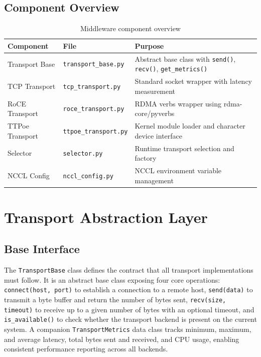 \documentclass[10pt,letterpaper]{article}
\begin{document}
\subsection{Component Overview}

\begin{table}[H]
\centering
\small
\begin{tabular}{@{}llp{7cm}@{}}
\toprule
\textbf{Component} & \textbf{File} & \textbf{Purpose} \\
\midrule
Transport Base & \texttt{transport\_base.py} & Abstract base class with \texttt{send()}, \texttt{recv()}, \texttt{get\_metrics()} \\
TCP Transport & \texttt{tcp\_transport.py} & Standard socket wrapper with latency measurement \\
RoCE Transport & \texttt{roce\_transport.py} & RDMA verbs wrapper using rdma-core/pyverbs \\
TTPoe Transport & \texttt{ttpoe\_transport.py} & Kernel module loader and character device interface \\
Selector & \texttt{selector.py} & Runtime transport selection and factory \\
NCCL Config & \texttt{nccl\_config.py} & NCCL environment variable management \\
\bottomrule
\end{tabular}
\caption{Middleware component overview}
\end{table}

\section{Transport Abstraction Layer}

\subsection{Base Interface}

The \texttt{TransportBase} class defines the contract that all transport implementations must follow. It is an abstract base class exposing four core operations: \texttt{connect(host, port)} to establish a connection to a remote host, \texttt{send(data)} to transmit a byte buffer and return the number of bytes sent, \texttt{recv(size, timeout)} to receive up to a given number of bytes with an optional timeout, and \texttt{is\_available()} to check whether the transport backend is present on the current system. A companion \texttt{TransportMetrics} data class tracks minimum, maximum, and average latency, total bytes sent and received, and CPU usage, enabling consistent performance reporting across all backends.
\end{document}
